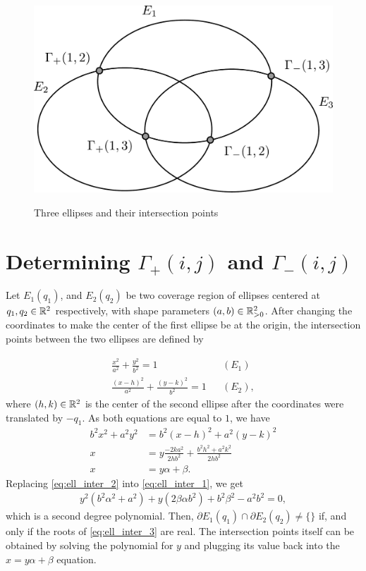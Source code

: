 \begin{figure}[H]
	\centering
	\caption{Three ellipses and their intersection points}
	\includegraphics[scale=.34]{tex/figures/3ellipses_intersect.pdf}
	\fautor
	\label{fig:3ellipses_intersect}
\end{figure}

\section{Determining $\Gamma_+(i,j)$ and $\Gamma_-(i,j)$}\label{section:ellipses_intersection}

Let $E_1(q_1)$, and $E_2(q_2)$ be two coverage region of ellipses centered at $q_1, q_2\in\mathbb{R}^2$ respectively, with shape parameters $(a, b)\in\mathbb{R}^2_{>0}$. After changing the coordinates to make the center of the first ellipse be at the origin, the intersection points between the two ellipses are defined by

\begin{align}
\frac{x^2}{a^2} + \frac{y^2}{b^2} = 1 && (E_1) \label{eq:ell_inter_1}\\
\frac{(x-h)^2}{a^2} + \frac{(y-k)^2}{b^2} = 1 && (E_2), \nonumber
\end{align}
where $(h,k)\in\mathbb{R}^2$ is the center of the second ellipse after the coordinates were translated by $-q_1$. As both equations are equal to $1$, we have
\begin{align}
    b^2x^2 + a^2y^2 &= b^2(x-h)^2 + a^2(y-k)^2 \nonumber\\
    x &= y\frac{-2ka^2}{2hb^2} + \frac{b^2h^2 + a^2k^2}{2hb^2} \nonumber\\
    x &= y\alpha + \beta.\label{eq:ell_inter_2}
\end{align}
Replacing \autoref{eq:ell_inter_2} into \autoref{eq:ell_inter_1}, we get
\begin{align}\label{eq:ell_inter_3}
y^2(b^2\alpha^2 + a^2) + y(2\beta\alpha b^2) + b^2\beta^2 -a^2b^2 = 0,
\end{align}
which is a second degree polynomial. Then, $\partial E_1(q_1) \cap \partial E_2(q_2) \neq \{\}$ if, and only if the roots of \autoref{eq:ell_inter_3} are real. The intersection points itself can be obtained by solving the polynomial for $y$ and plugging its value back into the $x=y\alpha + \beta$ equation.

